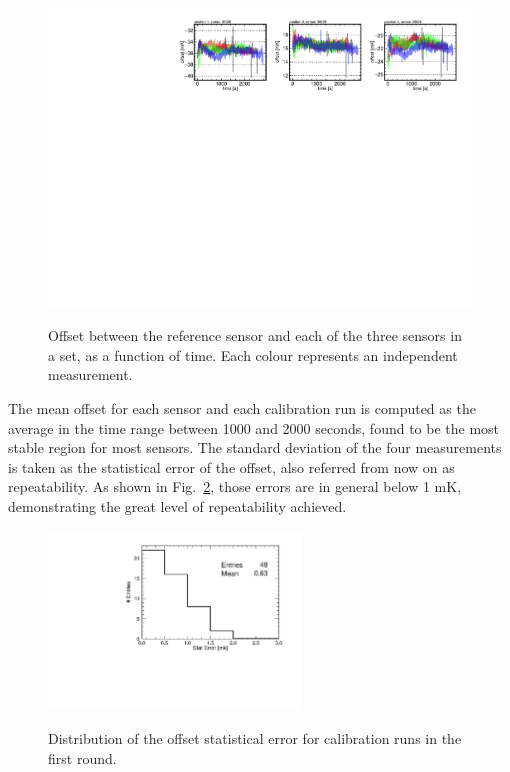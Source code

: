 \label{sec:results_first_round}
\begin{figure}[htbp]
\centering
{\includegraphics[width=\textwidth]{images/figure_10.pdf}}
\caption{Offset between the reference sensor and each of the three sensors in a set, as a function of time. Each colour represents an independent measurement.}
\label{fi:CAL_offset_example}
\end{figure}

The mean offset for each sensor and each calibration run is computed as the average in the time range between 1000 and 2000 seconds, found to be the most stable region for most sensors. The standard deviation of the four measurements is taken as the statistical error of the offset, also referred from now on as repeatability. As shown in Fig.~\ref{fi:CAL_rms_1r}, those errors are in general below 1 mK, demonstrating the great level of repeatability achieved. 

\begin{figure}[htbp]
\centering
{\includegraphics[width=0.6\textwidth]{images/figure_11.pdf}}
\caption{Distribution of the offset statistical error for calibration runs in the first round.}
\label{fi:CAL_rms_1r}
\end{figure}

